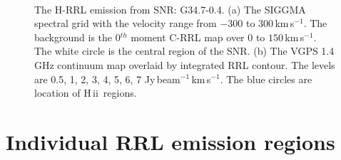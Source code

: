 \documentclass[manuscript]{aastex61}
\newcommand{\hii}{{\rm H\,}{{\sc ii}}}
\newcommand{\kms}{\,km\,s$^{-1}$}
\begin{document}
\begin{figure}[htbp]
\centering
{}
\\
\caption{The H-RRL emission from SNR: G34.7-0.4.
          (a) The SIGGMA spectral grid with the velocity range from $-300$ to $300$\kms.
	  The background is the 0$^{th}$ moment C-RRL map over $0$ to $150$\kms.
	  The white circle is the central region of the SNR.
	  (b) The VGPS 1.4 GHz continuum map overlaid by integrated RRL contour.
	  The levels are 0.5, 1, 2, 3, 4, 5, 6, 7 Jy\,beam$^{-1}$\kms.
	  The blue circles are location of \hii\ regions.
	  }
\label{fig_snr-g347}
\end{figure}

\section{Individual RRL emission regions}\label{sec_indi}
\end{document}
